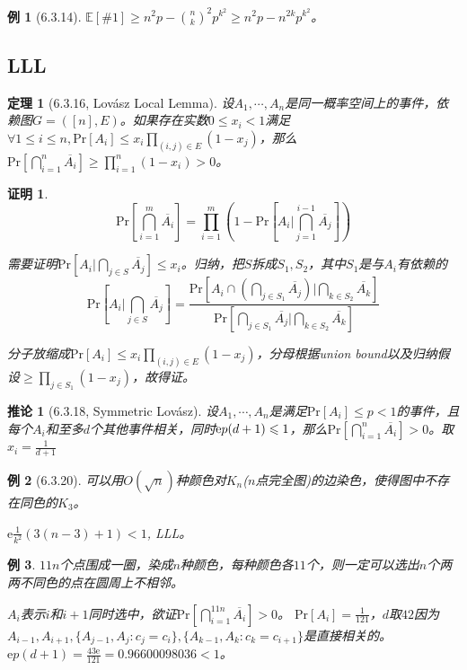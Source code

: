 \documentclass[landscape, a4paper]{article}
\theoremstyle{compact}
\newtheorem{theorem}{定理}
\newtheorem{example}{例}
\newtheorem{corollary}{推论}
\newtheorem{Proof}{证明}
\def\le{\leqslant}
\def\ge{\geqslant}
\def\Pr#1{\text{Pr}[{#1}]}
\def\E#1{\mathbb{E}[{#1}]}
\begin{document}
\begin{multicols}{3}
\begin{example}[6.3.14]
	$\E{\#1} \ge n^2p - \binom{n}{k}^2p^{k^2} \ge n^2p - n^{2k}p^{k^2}$。
\end{example}
\subsection{LLL}
\begin{theorem}[6.3.16, Lov\'asz Local Lemma]
	设$A_1, \cdots, A_n$是同一概率空间上的事件，依赖图$G = ([n], E)$。如果存在实数$0 \le x_i < 1$满足$\forall 1 \le i \le n, \Pr{A_i} \le x_i \prod_{(i,j) \in E}(1 - x_j)$，那么$\Pr{\bigcap_{i=1}^{n}\overline{A_i}} \ge \prod_{i=1}^{n}(1 - x_i) > 0$。
\end{theorem}
\begin{Proof}
	$$\Pr{\bigcap_{i=1}^{m}\overline{A_i}} = \prod_{i=1}^{m}(1 - \Pr{A_i | \bigcap_{j=1}^{i-1}\overline{A_j}})$$
	
	需要证明$\Pr{A_i | \bigcap_{j \in S}\overline{A_j}} \le x_i$。归纳，把$S$拆成$S_1, S_2$，其中$S_1$是与$A_i$有依赖的
	$$\Pr{A_i | \bigcap_{j \in S}\overline{A_j}} = \frac{\Pr{A_i \cap (\bigcap_{j \in S_1}\overline{A_j}) | \bigcap_{k \in S_2}\overline{A_k}}}{\Pr{\bigcap_{j \in S_1}\overline{A_j} | \bigcap_{k \in S_2} \overline{A_k}}}$$
	
	分子放缩成$\Pr{A_i} \le x_i \prod_{(i,j) \in E}(1 - x_j)$，分母根据union bound以及归纳假设$\ge \prod_{j \in S_1}(1 - x_j)$，故得证。
\end{Proof}
\begin{corollary}[6.3.18, Symmetric Lov\'asz]
	设$A_1, \cdots, A_n$是满足$\Pr{A_i} \le p < 1$的事件，且每个$A_i$和至多$d$个其他事件相关，同时$\text e p(d+1) \le 1$，那么$\Pr{\bigcap_{i=1}^{n}\overline{A_i}} > 0$。\textit{取$x_i = \frac{1}{d+1}$}
\end{corollary}

\begin{example}[6.3.20]
	可以用$O(\sqrt n)$种颜色对$K_n$($n$点完全图)的边染色，使得图中不存在同色的$K_3$。
	
	$\text{e}\frac{1}{k^2}(3(n-3)+1) < 1$, LLL。
\end{example}

\begin{example}
	$11n$个点围成一圈，染成$n$种颜色，每种颜色各$11$个，则一定可以选出$n$个两两不同色的点在圆周上不相邻。
	
	\textit{
	$A_i$表示$i$和$i+1$同时选中，欲证$\Pr{\bigcap_{i=1}^{11n}\overline{A_i}} > 0$。
	$\Pr{A_i} = \frac{1}{121}$，$d$取$42$因为$A_{i-1}, A_{i+1}, \{A_{j-1}, A_{j}: c_j = c_i\}, \{A_{k-1}, A_{k}: c_k = c_{i+1}\}$是直接相关的。
	$\text{e}p(d+1) = \frac{43\text{e}}{121} = 0.96600098036 < 1$。
	}
\end{example}


\end{multicols}
\end{document}
